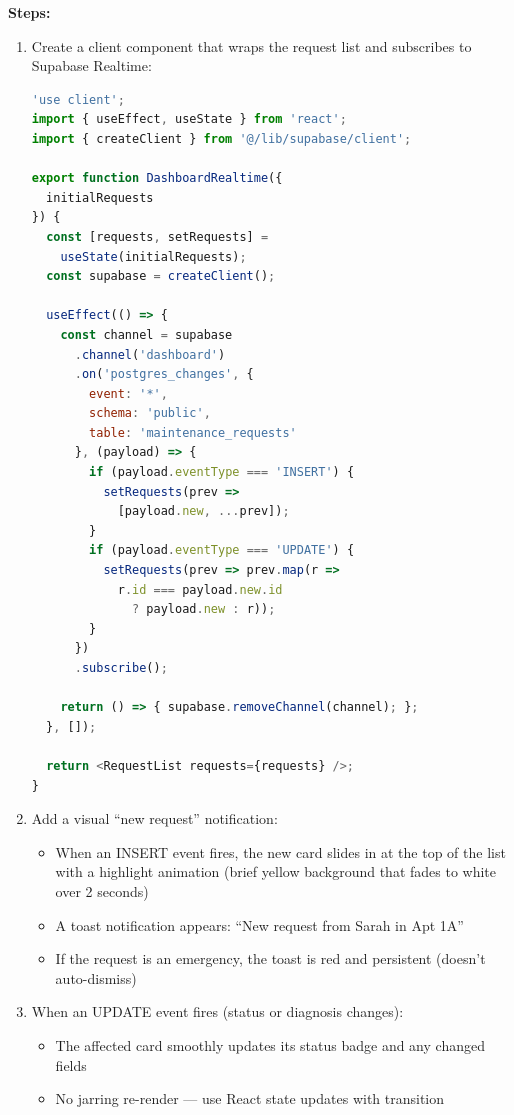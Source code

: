 \documentclass[11pt, a4paper]{article}
\begin{document}
\textbf{Steps:}
\begin{enumerate}[leftmargin=2em, itemsep=2pt]
  \item Create a client component that wraps the request list and subscribes to Supabase Realtime:
\begin{lstlisting}[language=JavaScript]
'use client';
import { useEffect, useState } from 'react';
import { createClient } from '@/lib/supabase/client';

export function DashboardRealtime({ 
  initialRequests 
}) {
  const [requests, setRequests] = 
    useState(initialRequests);
  const supabase = createClient();

  useEffect(() => {
    const channel = supabase
      .channel('dashboard')
      .on('postgres_changes', {
        event: '*',
        schema: 'public',
        table: 'maintenance_requests'
      }, (payload) => {
        if (payload.eventType === 'INSERT') {
          setRequests(prev => 
            [payload.new, ...prev]);
        }
        if (payload.eventType === 'UPDATE') {
          setRequests(prev => prev.map(r => 
            r.id === payload.new.id 
              ? payload.new : r));
        }
      })
      .subscribe();

    return () => { supabase.removeChannel(channel); };
  }, []);

  return <RequestList requests={requests} />;
}
\end{lstlisting}

  \item Add a visual ``new request'' notification:
    \begin{itemize}[itemsep=1pt]
      \item When an INSERT event fires, the new card slides in at the top of the list with a highlight animation (brief yellow background that fades to white over 2 seconds)
      \item A toast notification appears: ``New request from Sarah in Apt 1A''
      \item If the request is an emergency, the toast is red and persistent (doesn't auto-dismiss)
    \end{itemize}

  \item When an UPDATE event fires (status or diagnosis changes):
    \begin{itemize}[itemsep=1pt]
      \item The affected card smoothly updates its status badge and any changed fields
      \item No jarring re-render --- use React state updates with transition
    \end{itemize}
\end{enumerate}
\end{document}
